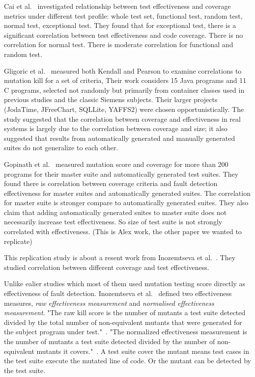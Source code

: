 Cai et al.~\cite{cai2005effect} investigated relationship between test effectiveness and coverage metrics under different test profile: whole test set, functional test, random test, normal test, exceptional test. They found that for exceptional test, there is a significant correlation between test effectiveness and code coverage. There is no correlation for normal test. There is moderate correlation for functional and random test.


Gligoric et al.~\cite{gligoric2013comparing} measured both Kendall and Pearson to examine correlations to mutation kill for a set of criteria, Their work considers 15 Java programs and 11 C programs, selected not randomly but primarily from container classes used in previous studies and the classic Siemens subjects. Their larger projects (JodaTime, JFreeChart, SQLLite, YAFFS2) were chosen opportunistically. The study suggested that the correlation between coverage and effectiveness in real systems
is largely due to the correlation between coverage and size; it also suggested that results from automatically generated and manually generated suites do not generalize to each other.

Gopinath et al.~\cite{gopinath2014code} measured mutation score and coverage for more than 200 programs for their master suite and automatically generated test suites. They found there is correlation between coverage criteria and fault detection effectiveness for master suites and automatically generated suites. The correlation for master suite is stronger compare to automatically generated suites. They also claim that adding automatically generated suites to master suite does not necessarily increase test effectiveness. So size of test suite is not strongly correlated with effectiveness. (This is Alex work, the other paper we wanted to replicate)

This replication study is about a resent work from Inozemtseva et al.~\cite{inozemtseva2014coverage}. They studied correlation between different coverage and test effectiveness.

Unlike ealier studies which most of them used mutation testing score directly as effectiveness of fault detection. Inozemtseva et al.~\cite{inozemtseva2014coverage} defined two effectiveness measures, \textit{raw effectiveness measurement} and \textit{normalised effectiveness measurement}. "The raw kill score is the number of mutants a test suite detected divided by the total number of
non-equivalent mutants that were generated for the subject program under test."~\cite{inozemtseva2014coverage}. "The normalized effectiveness measurement is the number of mutants a test suite detected divided by the number of non-equivalent mutants it covers."~\cite{inozemtseva2014coverage}. A test suite cover the mutant means test cases in the test suite execute the mutated line of code. Or the mutant can be detected by the test suite. 

